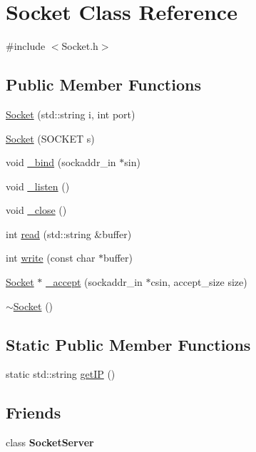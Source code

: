 \hypertarget{classSocket}{}\section{Socket Class Reference}
\label{classSocket}


{\ttfamily \#include $<$Socket.\+h$>$}

\subsection*{Public Member Functions}
\begin{DoxyCompactItemize}
\item 
\mbox{\hyperlink{classSocket_a4c7a40e6c1513edf63e53b74b4f32b80}{Socket}} (std\+::string i, int port)
\item 
\mbox{\hyperlink{classSocket_a7e2193bd6a9b6846f90eaf4786cfc41b}{Socket}} (S\+O\+C\+K\+ET s)
\item 
void \mbox{\hyperlink{classSocket_ab7c6b44800e7a621df9edae86d5fdfa8}{\+\_\+bind}} (sockaddr\+\_\+in $\ast$sin)
\item 
void \mbox{\hyperlink{classSocket_ac54a69178584b414d8137170156ad742}{\+\_\+listen}} ()
\item 
void \mbox{\hyperlink{classSocket_a284f2130a4115a77ebce742427fd0bdb}{\+\_\+close}} ()
\item 
int \mbox{\hyperlink{classSocket_a74fc13f1e87009d84871d73949a664b2}{read}} (std\+::string \&buffer)
\item 
int \mbox{\hyperlink{classSocket_ae2f8cf0b7d27c59600dc5ddf65f8a884}{write}} (const char $\ast$buffer)
\item 
\mbox{\hyperlink{classSocket}{Socket}} $\ast$ \mbox{\hyperlink{classSocket_a153f0c90d33f1d60133b3ab565679013}{\+\_\+accept}} (sockaddr\+\_\+in $\ast$csin, accept\+\_\+size size)
\item 
\mbox{\hyperlink{classSocket_aeac4eb6379a543d38ed88977d3b6630a}{$\sim$\+Socket}} ()
\end{DoxyCompactItemize}
\subsection*{Static Public Member Functions}
\begin{DoxyCompactItemize}
\item 
static std\+::string \mbox{\hyperlink{classSocket_a5f78c7dbb42b062df843a66431acd0de}{get\+IP}} ()
\end{DoxyCompactItemize}
\subsection*{Friends}
\begin{DoxyCompactItemize}
\item 
\mbox{\label{classSocket_a67ff8e58678084f56e1dba35f674f4eb}} 
class {\bfseries Socket\+Server}
\end{DoxyCompactItemize}


